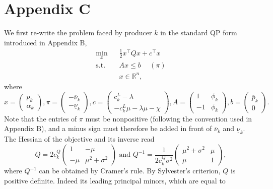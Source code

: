 \documentclass{article}
\begin{document}
\section*{Appendix C}

We first re-write the problem faced by producer $k$ in the standard QP form introduced in Appendix B,
\begin{align*}
\underset{x}{\min} \hspace{10pt} & \frac{1}{2}x^\top Q x + c^\top x\\
\mbox{s.t. } & Ax \le b \hspace{15pt} (\pi)\\
&x \in \mathbb{R}^n,
\end{align*}
where
\begin{equation*}
x = \begin{pmatrix} p_k \\ \alpha_k \end{pmatrix}, \pi = \begin{pmatrix} -\overline{\nu}_k \\ -\underline{\nu}_k \end{pmatrix}, c = \begin{pmatrix} c_k^L - \lambda \\ -c_k^L \mu - \lambda \mu - \chi \end{pmatrix}, A = \begin{pmatrix} 1 & \phi_k \\ -1 & \phi_k \end{pmatrix}, b = \begin{pmatrix} \overline{p}_k\\0\end{pmatrix}.
\end{equation*}
Note that the entries of $\pi$ must be nonpositive (following the convention used in Appendix B), and a minus sign must therefore be added in front of $\overline{\nu}_k$ and $\underline{\nu}_k$. The Hessian of the objective and its inverse read
\begin{equation*}
Q = 2 c_k^Q  \begin{pmatrix} 1 & -\mu \\ -\mu & \mu^2 + \sigma^2 \end{pmatrix} \mbox{ and } Q^{-1} = \frac{1}{2 c_k^Q \sigma^2} \begin{pmatrix} \mu^2 + \sigma^2 & \mu \\ \mu & 1 \end{pmatrix},
\end{equation*}
where $Q^{-1}$ can be obtained by Cramer's rule. By Sylvester's criterion, $Q$ is positive definite. Indeed its leading principal minors, which are equal to 
\end{document}
